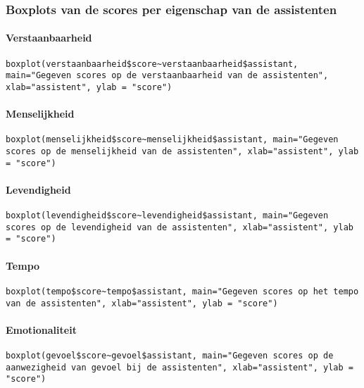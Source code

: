 \subsubsection{Boxplots van de scores per eigenschap van de assistenten}
\paragraph{Verstaanbaarheid}
\begin{lstlisting}
boxplot(verstaanbaarheid$score~verstaanbaarheid$assistant, main="Gegeven scores op de verstaanbaarheid van de assistenten", xlab="assistent", ylab = "score")
\end{lstlisting}

\paragraph{Menselijkheid}
\begin{lstlisting}
boxplot(menselijkheid$score~menselijkheid$assistant, main="Gegeven scores op de menselijkheid van de assistenten", xlab="assistent", ylab = "score")
\end{lstlisting}

\paragraph{Levendigheid}
\begin{lstlisting}
boxplot(levendigheid$score~levendigheid$assistant, main="Gegeven scores op de levendigheid van de assistenten", xlab="assistent", ylab = "score")
\end{lstlisting}

\paragraph{Tempo}
\begin{lstlisting}
boxplot(tempo$score~tempo$assistant, main="Gegeven scores op het tempo van de assistenten", xlab="assistent", ylab = "score")
\end{lstlisting}

\paragraph{Emotionaliteit}
\begin{lstlisting}
boxplot(gevoel$score~gevoel$assistant, main="Gegeven scores op de aanwezigheid van gevoel bij de assistenten", xlab="assistent", ylab = "score")
\end{lstlisting}


